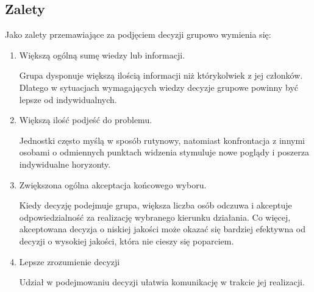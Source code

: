 \subsection{Zalety}
Jako zalety przemawiające za podjęciem decyzji grupowo wymienia się:
\begin{enumerate}

  \item Większą ogólną sumę wiedzy lub informacji.
   
   Grupa dysponuje większą ilością informacji niż którykolwiek z jej członków.
   Dlatego w sytuacjach wymagających wiedzy decyzje grupowe powinny być lepsze
   od indywidualnych.
   
   \item Większą ilość podjeść do problemu.
   
   Jednostki często myślą w sposób rutynowy, natomiast konfrontacja z innymi
   osobami o odmiennych punktach widzenia stymuluje nowe poglądy i poszerza
   indywidualne horyzonty.
   
   \item Zwiększona ogólna akceptacja końcowego wyboru.
   
   Kiedy decyzję podejmuje grupa, większa liczba osób odczuwa i akceptuje
   odpowiedzialność za realizację wybranego kierunku działania. Co więcej,
   akceptowana decyzja o niskiej jakości może okazać się bardziej efektywna od
   decyzji o wysokiej jakości, która nie cieszy się poparciem.
   
   \item Lepsze zrozumienie decyzji
   
   Udział w podejmowaniu decyzji ułatwia komunikację w trakcie jej realizacji.

\end{enumerate}

